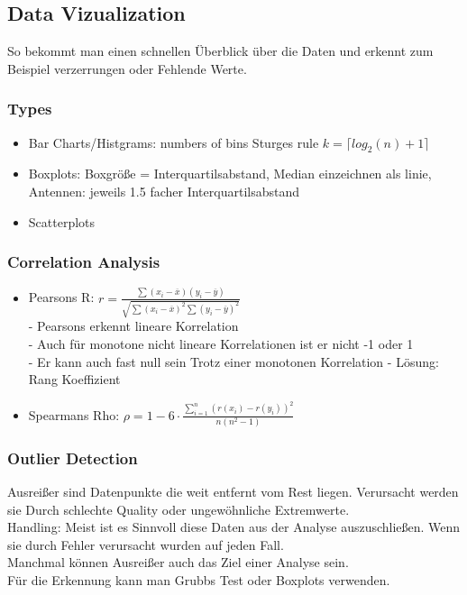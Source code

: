 \documentclass[a4paper]{scrartcl}
\begin{document}
\subsection{Data Vizualization}
So bekommt man einen schnellen Überblick über die Daten und erkennt zum Beispiel verzerrungen oder Fehlende Werte.\\
\subsubsection{Types}
\begin{itemize}
\item Bar Charts/Histgrams: numbers of bins Sturges rule $k=\lceil log_2(n)+1\rceil$\\
\item Boxplots: Boxgröße = Interquartilsabstand, Median einzeichnen als linie, Antennen: jeweils 1.5 facher Interquartilsabstand\\
\item Scatterplots
\end{itemize}
\subsubsection{Correlation Analysis}
\begin{itemize}
\item Pearsons R: $r=\frac{\sum(x_i-\overline{x})(y_i - \overline{y})}{\sqrt{\sum(x_i-\overline{x})^2\sum(y_i - \overline{y})^2}}$\\
- Pearsons erkennt lineare Korrelation\\
- Auch für monotone nicht lineare Korrelationen ist er nicht  -1 oder 1\\
- Er kann auch fast null sein Trotz einer monotonen Korrelation
- Lösung: Rang Koeffizient\\
\item Spearmans Rho: $\rho=1-6\cdot\frac{\sum\limits^n_{i=1}(r(x_i)-r(y_i))^2}{n(n^2-1)}$\\
\end{itemize}
\subsubsection{Outlier Detection}
Ausreißer sind Datenpunkte die weit entfernt vom Rest liegen. Verursacht werden sie Durch schlechte Quality oder ungewöhnliche Extremwerte.\\
Handling: Meist ist es Sinnvoll diese Daten aus der Analyse auszuschließen. Wenn sie durch Fehler verursacht wurden auf jeden Fall.\\
Manchmal können Ausreißer auch das Ziel einer Analyse sein.\\
Für die Erkennung kann man Grubbs Test oder Boxplots verwenden.\\
\end{document}
